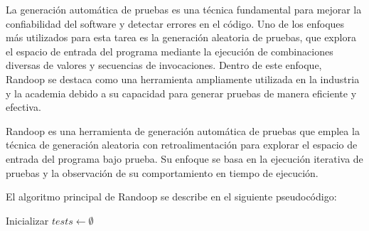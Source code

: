             
            
                
    

La generación automática de pruebas es una técnica fundamental para mejorar la confiabilidad del software y detectar errores en el código. 
Uno de los enfoques más utilizados para esta tarea es la generación aleatoria de pruebas, 
que explora el espacio de entrada del programa mediante la ejecución de combinaciones diversas de valores y secuencias de invocaciones. 
Dentro de este enfoque, Randoop se destaca como una herramienta ampliamente utilizada en la industria y la academia debido 
a su capacidad para generar pruebas de manera eficiente y efectiva.

Randoop es una herramienta de generación automática de pruebas que emplea la técnica de generación aleatoria con retroalimentación para explorar el espacio de entrada del programa bajo prueba. 
Su enfoque se basa en la ejecución iterativa de pruebas y la observación de su comportamiento en tiempo de ejecución.

El algoritmo principal de Randoop se describe en el siguiente pseudocódigo:

\begin{algorithm}[H]
    \SetAlgoLined
    
    Inicializar $tests \leftarrow \emptyset$\;
    
    \;
    \end{algorithm}

